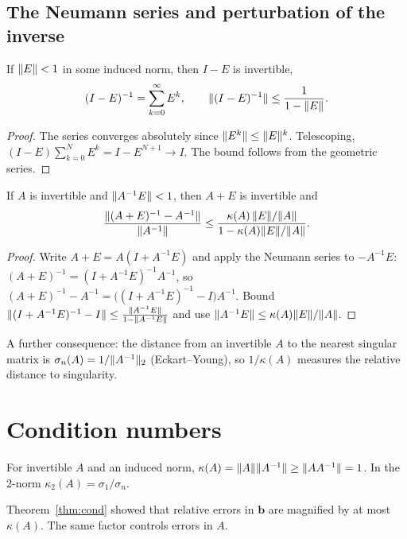 \subsection*{The Neumann series and perturbation of the inverse}

\begin{theorem}\label{thm:neumann}
If $\lVert E\rVert<1$ in some induced norm, then $I-E$ is invertible,
\[ (I-E)^{-1}=\sum_{k=0}^\infty E^k,\qquad\lVert(I-E)^{-1}\rVert\le\frac1{1-\lVert E\rVert}. \]
\end{theorem}

\begin{proof}
The series converges absolutely since $\lVert E^k\rVert\le\lVert E\rVert^k$. Telescoping, $(I-E)\sum_{k=0}^NE^k=I-E^{N+1}\to I$. The bound follows from the geometric series.
\end{proof}

\begin{corollary}\label{cor:perturbinv}
If $A$ is invertible and $\lVert A^{-1}E\rVert<1$, then $A+E$ is invertible and
\[ \frac{\lVert(A+E)^{-1}-A^{-1}\rVert}{\lVert A^{-1}\rVert}\le\frac{\kappa(A)\,\lVert E\rVert/\lVert A\rVert}{1-\kappa(A)\lVert E\rVert/\lVert A\rVert}. \]
\end{corollary}

\begin{proof}
Write $A+E=A(I+A^{-1}E)$ and apply the Neumann series to $-A^{-1}E$: $(A+E)^{-1}=(I+A^{-1}E)^{-1}A^{-1}$, so $(A+E)^{-1}-A^{-1}=\big((I+A^{-1}E)^{-1}-I\big)A^{-1}$. Bound $\lVert(I+A^{-1}E)^{-1}-I\rVert\le\frac{\lVert A^{-1}E\rVert}{1-\lVert A^{-1}E\rVert}$ and use $\lVert A^{-1}E\rVert\le\kappa(A)\lVert E\rVert/\lVert A\rVert$.
\end{proof}

A further consequence: the distance from an invertible $A$ to the nearest singular matrix is $\sigma_n(A)=1/\lVert A^{-1}\rVert_2$ (Eckart--Young), so $1/\kappa(A)$ measures the relative distance to singularity.

\section{Condition numbers}

\begin{definition}
For invertible $A$ and an induced norm, $\kappa(A)=\lVert A\rVert\lVert A^{-1}\rVert\ge\lVert AA^{-1}\rVert=1$. In the 2-norm $\kappa_2(A)=\sigma_1/\sigma_n$.
\end{definition}

Theorem~\ref{thm:cond} showed that relative errors in $\mathbf{b}$ are magnified by at most $\kappa(A)$. The same factor controls errors in $A$.

